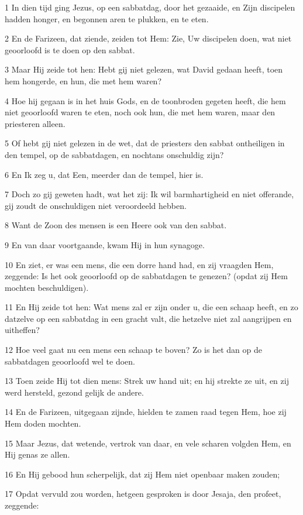 \par 1 In dien tijd ging Jezus, op een sabbatdag, door het gezaaide, en Zijn discipelen hadden honger, en begonnen aren te plukken, en te eten.
\par 2 En de Farizeen, dat ziende, zeiden tot Hem: Zie, Uw discipelen doen, wat niet geoorloofd is te doen op den sabbat.
\par 3 Maar Hij zeide tot hen: Hebt gij niet gelezen, wat David gedaan heeft, toen hem hongerde, en hun, die met hem waren?
\par 4 Hoe hij gegaan is in het huis Gods, en de toonbroden gegeten heeft, die hem niet geoorloofd waren te eten, noch ook hun, die met hem waren, maar den priesteren alleen.
\par 5 Of hebt gij niet gelezen in de wet, dat de priesters den sabbat ontheiligen in den tempel, op de sabbatdagen, en nochtans onschuldig zijn?
\par 6 En Ik zeg u, dat Een, meerder dan de tempel, hier is.
\par 7 Doch zo gij geweten hadt, wat het zij: Ik wil barmhartigheid en niet offerande, gij zoudt de onschuldigen niet veroordeeld hebben.
\par 8 Want de Zoon des mensen is een Heere ook van den sabbat.
\par 9 En van daar voortgaande, kwam Hij in hun synagoge.
\par 10 En ziet, er was een mens, die een dorre hand had, en zij vraagden Hem, zeggende: Is het ook geoorloofd op de sabbatdagen te genezen? (opdat zij Hem mochten beschuldigen).
\par 11 En Hij zeide tot hen: Wat mens zal er zijn onder u, die een schaap heeft, en zo datzelve op een sabbatdag in een gracht valt, die hetzelve niet zal aangrijpen en uitheffen?
\par 12 Hoe veel gaat nu een mens een schaap te boven? Zo is het dan op de sabbatdagen geoorloofd wel te doen.
\par 13 Toen zeide Hij tot dien mens: Strek uw hand uit; en hij strekte ze uit, en zij werd hersteld, gezond gelijk de andere.
\par 14 En de Farizeen, uitgegaan zijnde, hielden te zamen raad tegen Hem, hoe zij Hem doden mochten.
\par 15 Maar Jezus, dat wetende, vertrok van daar, en vele scharen volgden Hem, en Hij genas ze allen.
\par 16 En Hij gebood hun scherpelijk, dat zij Hem niet openbaar maken zouden;
\par 17 Opdat vervuld zou worden, hetgeen gesproken is door Jesaja, den profeet, zeggende:
